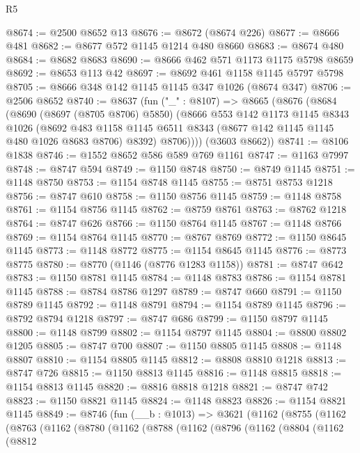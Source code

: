 \begin{lexlean}{R5}
\begin{coremodule}
@8674 := @2500 @8652 @13
@8676 := @8672 (@8674 @226)
@8677 := @8666 @481
@8682 := @8677 @572 @1145 @1214 @480 @8660
@8683 := @8674 @480
@8684 := @8682 @8683
@8690 := @8666 @462 @571 @1173 @1175 @5798 @8659
@8692 := @8653 @113 @42
@8697 := @8692 @461 @1158 @1145 @5797 @5798
@8705 := @8666 @348 @142 @1145 @1145 @347 @1026 (@8674 @347)
@8706 := @2506 @8652
@8740 := @8637
    (fun ("_" : @8107) =>
    @8665
      (@8676
        (@8684
          (@8690
            (@8697 (@8705 @8706) @5850)
            (@8666
              @553
              @142
              @1173
              @1145
              @8343
              @1026
              (@8692
                @483
                @1158
                @1145
                @6511
                @8343
                (@8677 @142 @1145 @1145 @480 @1026 @8683 @8706)
                @8392)
              @8706))))
      (@3603 @8662))
@8741 := @8106 @1838
@8746 := @1552 @8652 @586 @589 @769 @1161
@8747 := @1163 @7997
@8748 := @8747 @594
@8749 := @1150 @8748
@8750 := @8749 @1145
@8751 := @1148 @8750
@8753 := @1154 @8748 @1145
@8755 := @8751 @8753 @1218
@8756 := @8747 @610
@8758 := @1150 @8756 @1145
@8759 := @1148 @8758
@8761 := @1154 @8756 @1145
@8762 := @8759 @8761
@8763 := @8762 @1218
@8764 := @8747 @626
@8766 := @1150 @8764 @1145
@8767 := @1148 @8766
@8769 := @1154 @8764 @1145
@8770 := @8767 @8769
@8772 := @1150 @8645 @1145
@8773 := @1148 @8772
@8775 := @1154 @8645 @1145
@8776 := @8773 @8775
@8780 := @8770 (@1146 (@8776 @1283 @1158))
@8781 := @8747 @642
@8783 := @1150 @8781 @1145
@8784 := @1148 @8783
@8786 := @1154 @8781 @1145
@8788 := @8784 @8786 @1297
@8789 := @8747 @660
@8791 := @1150 @8789 @1145
@8792 := @1148 @8791
@8794 := @1154 @8789 @1145
@8796 := @8792 @8794 @1218
@8797 := @8747 @686
@8799 := @1150 @8797 @1145
@8800 := @1148 @8799
@8802 := @1154 @8797 @1145
@8804 := @8800 @8802 @1205
@8805 := @8747 @700
@8807 := @1150 @8805 @1145
@8808 := @1148 @8807
@8810 := @1154 @8805 @1145
@8812 := @8808 @8810 @1218
@8813 := @8747 @726
@8815 := @1150 @8813 @1145
@8816 := @1148 @8815
@8818 := @1154 @8813 @1145
@8820 := @8816 @8818 @1218
@8821 := @8747 @742
@8823 := @1150 @8821 @1145
@8824 := @1148 @8823
@8826 := @1154 @8821 @1145
@8849 := @8746
    (fun (__b : @1013) =>
    @3621
      (@1162
        (@8755
          (@1162
            (@8763
              (@1162
                (@8780
                  (@1162
                    (@8788
                      (@1162
                        (@8796
                          (@1162
                            (@8804
                              (@1162
                                (@8812

\end{coremodule}
\end{lexlean}
